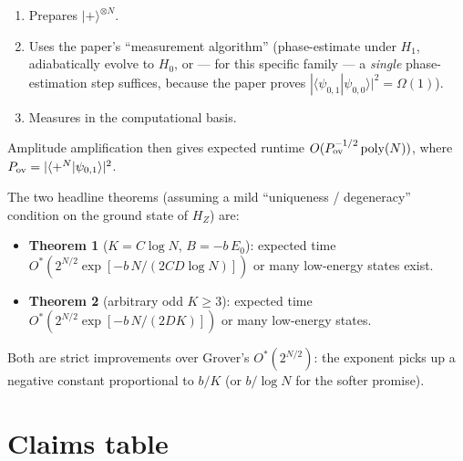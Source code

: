 \documentclass[11pt]{article}
\begin{document}
\begin{enumerate}
\item Prepares $|+\rangle^{\otimes N}$.
\item Uses the paper's ``measurement algorithm'' (phase-estimate under $H_1$, adiabatically evolve to $H_0$, or --- for this specific family --- a \emph{single} phase-estimation step suffices, because the paper proves $|\langle\psi_{0,1}|\psi_{0,0}\rangle|^2 = \Omega(1)$).
\item Measures in the computational basis.
\end{enumerate}

Amplitude amplification then gives expected runtime $O(P_{\rm ov}^{-1/2}\,\mathrm{poly}(N))$, where $P_{\rm ov} = |\langle +^N | \psi_{0,1}\rangle|^2$.

The two headline theorems (assuming a mild ``uniqueness / degeneracy'' condition on the ground state of $H_Z$) are:
\begin{itemize}
\item \textbf{Theorem 1} ($K = C\log N$, $B = -b\,E_0$): expected time $O^*\!\left(2^{N/2} \exp[-b\,N/(2CD\log N)]\right)$ or many low-energy states exist.
\item \textbf{Theorem 2} (arbitrary odd $K \ge 3$): expected time $O^*\!\left(2^{N/2} \exp[-b\,N/(2DK)]\right)$ or many low-energy states.
\end{itemize}

Both are strict improvements over Grover's $O^*(2^{N/2})$: the exponent picks up a negative constant proportional to $b/K$ (or $b/\log N$ for the softer promise).

\section{Claims table}
\end{document}
